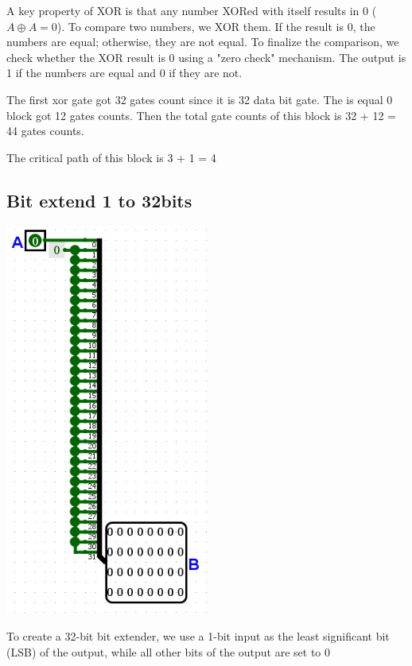 \documentclass{article}
\begin{document}
\hspace{2em} A key property of XOR is that any number XORed with itself results in 0 (\( A \oplus A = 0 \)). To compare two numbers, we XOR them. If the result is 0, the numbers are equal; otherwise, they are not equal. To finalize the comparison, we check whether the XOR result is 0 using a "zero check" mechanism. The output is 1 if the numbers are equal and 0 if they are not.

\hspace{2em}The first xor gate got 32 gates count since it is 32 data bit gate. The is equal 0 block got 12 gates counts. Then the total gate counts of this block is 32 + 12 = 44 gates counts.

\hspace{2em}The critical path of this block is 3 + 1 = 4
\subsection{Bit extend 1 to 32bits}
\begin{center}
    \includegraphics[width=0.5\textwidth]{images/BitExtend1to32.png}
\end{center}

\hspace*{2em}To create a 32-bit bit extender, we use a 1-bit input as the least significant bit (LSB) of the output, while all other bits of the output are set to 0
\end{document}
